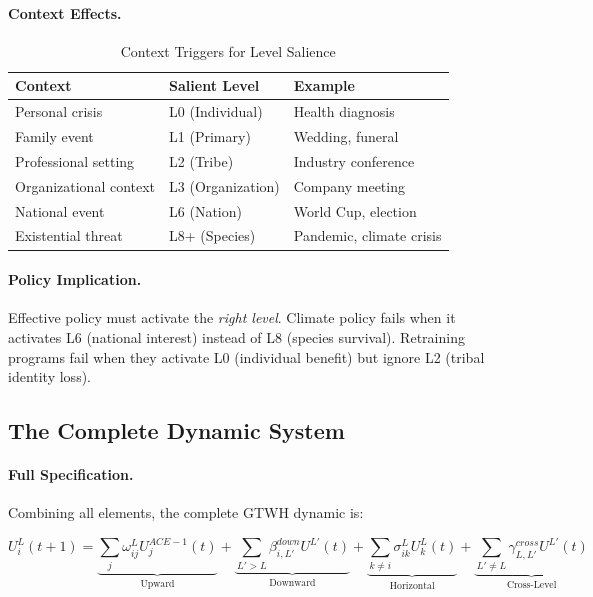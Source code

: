\paragraph{Context Effects.}
\begin{table}[htbp]
\centering
\caption{Context Triggers for Level Salience}
\label{tab:gtwh-salience}
\renewcommand{\arraystretch}{1.3}
\begin{tabular}{@{}lll@{}}
\toprule
\textbf{Context} & \textbf{Salient Level} & \textbf{Example} \\
\midrule
Personal crisis & L0 (Individual) & Health diagnosis \\
Family event & L1 (Primary) & Wedding, funeral \\
Professional setting & L2 (Tribe) & Industry conference \\
Organizational context & L3 (Organization) & Company meeting \\
National event & L6 (Nation) & World Cup, election \\
Existential threat & L8+ (Species) & Pandemic, climate crisis \\
\bottomrule
\end{tabular}
\end{table}

\paragraph{Policy Implication.}
Effective policy must activate the \textit{right level}. Climate policy 
fails when it activates L6 (national interest) instead of L8 (species survival). 
Retraining programs fail when they activate L0 (individual benefit) but 
ignore L2 (tribal identity loss).

\subsection{The Complete Dynamic System}

\paragraph{Full Specification.}
Combining all elements, the complete GTWH dynamic is:

\begin{tcolorbox}[colback=blue!5!white, colframe=blue!75!black, title=The GTWH Master Equation]
\begin{equation}
\boxed{
U^L_i(t+1) = \underbrace{\sum_{j} \omega^L_{ij} U^{ACE-1}_j(t)}_{\text{Upward}} + 
\underbrace{\sum_{L'>L} \beta^{down}_{i,L'} U^{L'}(t)}_{\text{Downward}} + 
\underbrace{\sum_{k \neq i} \sigma^L_{ik} U^L_k(t)}_{\text{Horizontal}} + 
\underbrace{\sum_{L' \neq L} \gamma^{cross}_{L,L'} U^{L'}(t)}_{\text{Cross-Level}}
}
\end{equation}
\end{tcolorbox}


